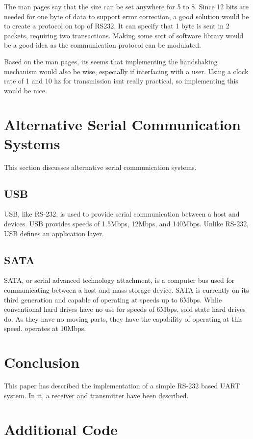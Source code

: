 \documentclass[12pt, a4paper]{article}
\begin{document}
The man pages say that the size can be set anywhere for 5 to 8. Since 12 bits are needed for one byte of data
to support error correction, a good solution would be to create a protocol on top of RS232. It can specify
that 1 byte is sent in 2 packets, requiring two transactions. Making some sort of software library would be
a good idea as the communication protocol can be modulated.

Based on the man pages, its seems that implementing the handshaking mechanism would also be wise, especially if
interfacing with a user. Using a clock rate of 1 and 10 hz for transmission isnt really practical, so implementing
this would be nice.

\section{Alternative Serial Communication Systems}
This section discusses alternative serial communication systems.
\subsection{USB}
USB, like RS-232, is used to provide serial communication between a host and devices. USB provides speeds of 1.5Mbps,
12Mbps, and 140Mbps. Unlike RS-232, USB defines an application layer.
\subsection{SATA}
SATA, or serial advanced technology attachment, is a computer bus used for communicating between a host and mass
storage device. SATA is currently on its third generation and capable of operating at speeds up to 6Mbps. Whlie
conventional hard drives have no use for speeds of 6Mbps, sold state hard drives do. As they have no moving parts,
they have the capability of operating at this speed.
operates at 10Mbps.

\section{Conclusion}
This paper has described the implementation of a simple RS-232 based UART system. In it, a receiver and transmitter
have been described. 

\section{Additional Code}
\lstset{caption=Receiver Testbench,label=lst:rectb}

\end{document}
